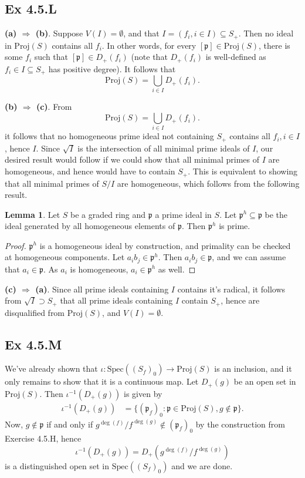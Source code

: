 \documentclass{article}
\theoremstyle{definition}
\newtheorem{lemma}[theorem]{Lemma}
\newcommand{\Spec}{\text{Spec}}
\newcommand{\Proj}{\text{Proj}}
\begin{document}
\subsection*{Ex 4.5.L}

\textbf{(a) $\Rightarrow$ (b)}. Suppose $V(I) = \emptyset$, and that $I = (f_i,
i \in I) \subseteq S_{+}$. Then no ideal in $\Proj(S)$ contains all $f_i$. In
other words, for every $[\mathfrak{p}] \in \Proj(S)$, there is some $f_i$ such
that $[\mathfrak{p}] \in D_{+}(f_i)$ (note that $D_{+}(f_i)$ is well-defined as
$f_i \in I \subseteq S_{+}$ has positive degree). It follows that 
\[
	\Proj(S) = \bigcup_{i \in I}D_{+}(f_i).
\] 

\textbf{(b) $\Rightarrow$ (c)}. From
\[
	\Proj(S) = \bigcup_{i \in I}D_{+}(f_i).
\] 
it follows that no homogeneous prime ideal not containing $S_{+}$ contains all
$f_i, i \in I$, hence $I$. Since $\sqrt{I}$ is the intersection of all minimal
prime ideals of $I$, our desired result would follow if we could show that all
minimal primes of $I$ are homogeneous, and hence would have to contain $S_{+}$.
This is equivalent to showing that all minimal primes of $S/I$ are homogeneous,
which follows from the following result.

\begin{lemma}
	Let $S$ be a graded ring and $\mathfrak{p}$	a prime ideal in $S$.
	Let $\mathfrak{p}^{h} \subseteq \mathfrak{p}$ be the ideal generated 
	by all homogeneous elements of $\mathfrak{p}$. Then $\mathfrak{p}^{h}$
	is prime.
\end{lemma}
\begin{proof}
	$\mathfrak{p}^{h}$ is a homogeneous ideal by construction, and primality
	can be checked at homogeneous components. Let $a_i b_j \in
	\mathfrak{p}^{h}$. Then $a_i b_j \in \mathfrak{p}$, and we can assume that
	$a_i \in \mathfrak{p}$. As $a_i$ is homogeneous, $a_i \in \mathfrak{p}^{h}$
	as well.
\end{proof}

\textbf{(c) $\Rightarrow$ (a)}. Since all prime ideals containing $I$ contains
it's radical, it follows from $\sqrt{I} \supset S_{+}$ that all prime ideals
containing $I$ contain $S_{+}$, hence are disqualified from $\Proj(S)$, and
$V(I) = \emptyset$.

\subsection*{Ex 4.5.M}

We've already shown that $\iota : \Spec((S_f)_0) \to \Proj(S)$ is an inclusion,
and it only remains to show that it is a continuous map. Let $D_{+}(g)$ be an
open set in $\Proj(S)$. Then $\iota^{-1}(D_{+}(g))$ is given by
\begin{align*}
	\iota^{-1}(D_{+}(g))
	&=
	\{
		(\mathfrak{p}_f)_{0}
		:
		\mathfrak{p} \in \Proj(S),
		g \not \in \mathfrak{p}
	\}.
\end{align*}
Now, $g \not \in \mathfrak{p}$ if and only if $g^{\deg(f)}/f^{\deg(g)} \not \in
(\mathfrak{p}_f)_0$ by the construction from Exercise 4.5.H, hence 
\[
	\iota^{-1}(D_{+}(g))
	=
	D_{+}(g^{\deg(f)}/f^{\deg(g)})
\] 
is a distinguished open set in $\Spec((S_f)_0)$ and we are done.
\end{document}
